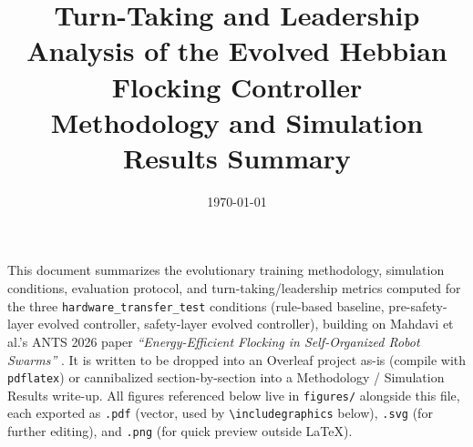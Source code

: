 \documentclass[11pt]{article}
\title{Turn-Taking and Leadership Analysis of the Evolved Hebbian Flocking Controller\\
\large Methodology and Simulation Results Summary}
\author{}
\date{\today}
\begin{document}
\maketitle

\noindent This document summarizes the evolutionary training methodology, simulation conditions,
evaluation protocol, and turn-taking/leadership metrics computed for the three
\texttt{hardware\_transfer\_test} conditions (rule-based baseline, pre-safety-layer evolved
controller, safety-layer evolved controller), building on Mahdavi et al.'s ANTS 2026 paper
\emph{``Energy-Efficient Flocking in Self-Organized Robot Swarms''} \cite{mahdavi2026}. It is
written to be dropped into an Overleaf
project as-is (compile with \texttt{pdflatex}) or cannibalized section-by-section into a
Methodology / Simulation Results write-up. All figures referenced below live in
\texttt{figures/} alongside this file, each exported as \texttt{.pdf} (vector, used by
\texttt{\textbackslash includegraphics} below), \texttt{.svg} (for further editing), and
\texttt{.png} (for quick preview outside LaTeX).
\end{document}
